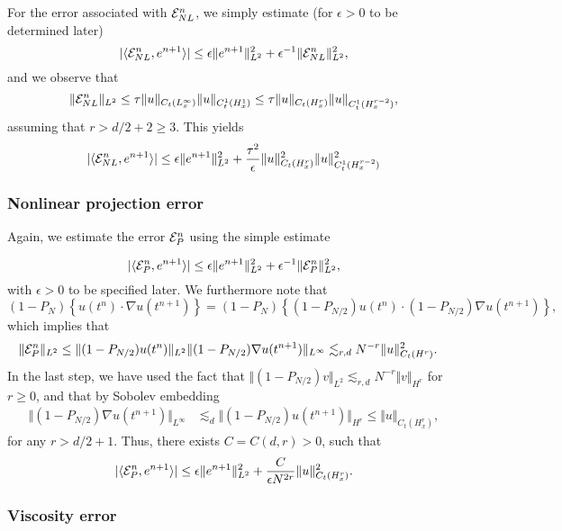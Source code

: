 \documentclass[reqno,a4paper]{amsart}
\begin{document}
For the error associated with $\mathcal{E}^{n}_{NL}$, we simply estimate (for $\epsilon > 0$ to be determined later)
\[
|\langle \mathcal{E}^n_{NL}, e^{n+1} \rangle |
\le
\epsilon \Vert e^{n+1} \Vert_{L^2}^2
+
\epsilon^{-1} \Vert \mathcal{E}^n_{NL} \Vert_{L^2}^2,
\]
and we observe that 
\[
\Vert \mathcal{E}^n_{NL} \Vert_{L^2} 
\le
{\tau}
\Vert u \Vert_{C_t(L^\infty_x)}
\Vert u \Vert_{C^1_t(H^1_x)}
\le
{\tau}
\Vert u \Vert_{C_t(H^r_x)}
\Vert u \Vert_{C^1_t(H^{r-2}_x)},
\]
assuming that $r > d/2+2 \ge 3$. This yields
\begin{align} \label{eq:err-NL}
|\langle \mathcal{E}^n_{NL}, e^{n+1} \rangle |
\le
\epsilon \Vert e^{n+1} \Vert_{L^2}^2
+
\frac{{\tau}^2}{\epsilon}
\Vert u \Vert_{C_t(H^r_x)}^2
\Vert u \Vert_{C^1_t(H^{r-2}_x)}^2
\end{align}

\subsubsection{Nonlinear projection error}

Again, we estimate the error $\mathcal{E}^{n}_{P}$ using the simple estimate 

\[
|\langle \mathcal{E}^n_{P}, e^{n+1} \rangle |
\le
\epsilon \Vert e^{n+1} \Vert_{L^2}^2
+
\epsilon^{-1} \Vert \mathcal{E}^n_{P} \Vert_{L^2}^2,
\]
with $\epsilon > 0$ to be specified later.
We furthermore note that 
\[
(1-P_N) \left\{u(t^n) \cdot \nabla u(t^{n+1})\right\}
=
(1-P_N) \left\{ (1-P_{N/2})u(t^n) \cdot (1-P_{N/2})\nabla u(t^{n+1})\right\},
\]
which implies that
\begin{align*}
\Vert \mathcal{E}^n_{P} \Vert_{L^2}
&\le
\Vert (1-P_{N/2})u(t^n) \Vert_{L^2}
\Vert (1-P_{N/2}) \nabla u(t^{n+1}) \Vert_{L^\infty}
\lesssim_{r,d}
N^{-r} \Vert u \Vert_{C_t(H^r)}^2.
\end{align*}
In the last step, we have used the fact that $\Vert (1-P_{N/2}) v \Vert_{L^2} \lesssim_{r,d} N^{-r} \Vert v \Vert_{H^r}$ for $r \ge 0$, and that by Sobolev embedding
\begin{align*}
\Vert (1-P_{N/2}) \nabla u(t^{n+1}) \Vert_{L^\infty}
&\lesssim_d
\Vert (1-P_{N/2}) u(t^{n+1}) \Vert_{H^{r}}
\le
\Vert u \Vert_{C_t(H^r_x)},
\end{align*}
for any $r > d/2+1$. Thus, there exists $C = C(d,r)>0$, such that
\begin{gather} \label{eq:err-P}
|\langle \mathcal{E}^n_{P}, e^{n+1} \rangle |
\le
\epsilon \Vert e^{n+1} \Vert_{L^2}^2
+
\frac{C}{\epsilon N^{2r}} \Vert u \Vert_{C_t(H^r_x)}^2.
\end{gather}

\subsubsection{Viscosity error}
\end{document}
